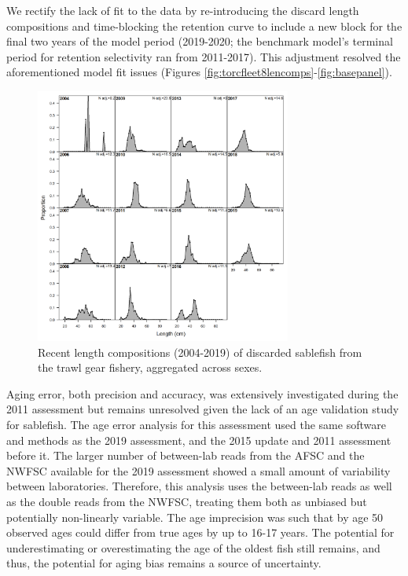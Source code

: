 \documentclass[11pt,
  english,
  a4paper,
]{article}
\begin{document}
We rectify the lack of fit to the data by re-introducing the discard length compositions and time-blocking the retention curve to include a new block for the final two years of the model period (2019-2020; the benchmark model's terminal period for retention selectivity ran from 2011-2017). This adjustment resolved the aforementioned model fit issues (Figures \ref{fig:torcfleet8lencomps}-\ref{fig:basepanel}).

\leavevmode\tagmcend\tagstructend\par


\begin{figure}
\centering
\includegraphics[width=0.75\textwidth,height=0.75\textheight]{figs/comp_lendat_flt3mkt1.png}
\caption{Recent length compositions (2004-2019) of discarded sablefish from the trawl gear fishery, aggregated across sexes.}
\end{figure}

\tagmcend\tagstructend


Aging error, both precision and accuracy, was extensively investigated during the 2011 assessment but remains unresolved given the lack of an age validation study for sablefish. The age error analysis for this assessment used the same software and methods as the 2019 assessment, and the 2015 update and 2011 assessment before it. The larger number of between-lab reads from the AFSC and the NWFSC available for the 2019 assessment showed a small amount of variability between laboratories. Therefore, this analysis uses the between-lab reads as well as the double reads from the NWFSC, treating them both as unbiased but potentially non-linearly variable. The age imprecision was such that by age 50 observed ages could differ from true ages by up to 16-17 years. The potential for underestimating or overestimating the age of the oldest fish still remains, and thus, the potential for aging bias remains a source of uncertainty.
\end{document}

